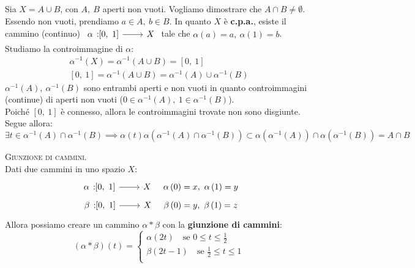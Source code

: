 \begin{demonstration}
	Sia $X=A\cup B$, con $A,\ B$ aperti non vuoti. Vogliamo dimostrare che $A\cap B\neq \emptyset$. Essendo non vuoti, prendiamo $a\in A,\ b\in B$. In quanto $X$ è \textbf{c.p.a.}, esiste il cammino (continuo) $\funz{\alpha}{\left[0,\ 1\right]}{X}$ tale che $\alpha\left(a\right)=a,\ \alpha\left(1\right)=b$.\\
	Studiamo la controimmagine di $\alpha$:
	\begin{gather*}
		\alpha^{-1}\left(X\right)=\alpha^{-1}\left(A\cup B\right)=\left[0,\ 1\right]\\
		\left[0,\ 1\right]=\alpha^{-1}\left(A\cup B\right)=\alpha^{-1}\left(A\right)\cup \alpha^{-1}\left(B\right)
	\end{gather*}
$\alpha^{-1}\left(A\right),\ \alpha^{-1}\left(B\right)$ sono entrambi aperti e non vuoti in quanto controimmagini (continue) di aperti non vuoti ($0\in \alpha^{-1}\left(A\right),\ 1\in \alpha^{-1}\left(B\right)$).\\
Poiché $\left[0,\ 1\right]$ è connesso, allora le controimmagini trovate non sono disgiunte. Segue allora:
\begin{equation*}
\exists t\in \alpha^{-1}\left(A\right)\cap \alpha^{-1}\left(B\right)\implies \alpha\left(t\right)\alpha\left(\alpha^{-1}\left(A\right)\cap \alpha^{-1}\left(B\right)\right)\subset\alpha\left(\alpha^{-1}\left(A\right)\right)\cap\alpha\left(\alpha^{-1}\left(B\right)\right)=A\cap B
\end{equation*}
\end{demonstration}
\begin{define}\textsc{Giunzione di cammini.}\\
	Dati due cammini in uno spazio $X$:
	\begin{gather*}
		\funz{\alpha}{\left[0,\ 1\right]}{X}\quad \alpha\left(0\right)=x,\ \alpha\left(1\right)=y\\
		\funz{\beta}{\left[0,\ 1\right]}{X}\quad \beta\left(0\right)=y,\ \beta\left(1\right)=z
	\end{gather*}
	Allora possiamo creare un cammino $\alpha \ast \beta$ con la \textbf{giunzione di cammini}:
	\begin{equation}
		\left(\alpha\ast\beta\right)\left(t\right)=\begin{cases}
			\alpha\left(2t\right)\quad\text{se }0\leq t\leq \frac{1}{2}\\
			\beta\left(2t-1\right)\quad\text{se }\frac{1}{2}\leq t\leq 1\\	
		\end{cases}
	\end{equation}
\vspace{-6mm}
\end{define}
